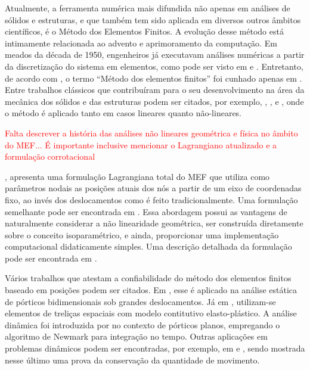 \documentclass[Tese.tex]{subfiles}
\begin{document}
Atualmente, a ferramenta numérica mais difundida não apenas em análises de sólidos e estruturas, e que também tem sido aplicada em diversos outros âmbitos científicos, é o Método dos Elementos Finitos. A evolução desse método está intimamente relacionada ao advento e aprimoramento da computação. Em meados da década de 1950, engenheiros já executavam análises numéricas a partir da discretização do sistema em elementos, como pode ser visto em  e . Entretanto, de acordo com , o termo ``Método dos elementos finitos''
foi cunhado apenas em . Entre trabalhos clássicos que contribuíram para o seu desenvolvimento na área da mecânica dos sólidos e das estruturas podem ser citados, por exemplo, , ,  e , onde o método é aplicado tanto em casos lineares quanto não-lineares.%

\textcolor{red}{Falta descrever a história das análises não lineares geométrica e física no âmbito do MEF... É importante inclusive mencionar o Lagrangiano atualizado e a formulação corrotacional}

, apresenta uma formulação Lagrangiana total do MEF que utiliza como parâmetros nodais as posições atuais dos nós a partir de um eixo de coordenadas fixo, ao invés dos deslocamentos como é feito tradicionalmente. Uma formulação semelhante pode ser encontrada em .
Essa abordagem possui as vantagens de naturalmente considerar a não linearidade geométrica, ser construída diretamente sobre o conceito isoparamétrico, e ainda, proporcionar uma implementação computacional didaticamente simples. Uma descrição detalhada da formulação pode ser encontrada em .

Vários trabalhos que atestam a confiabilidade do método dos elementos finitos baseado em posições podem ser citados. Em
, esse é aplicado na análise estática de pórticos bidimensionais sob grandes deslocamentos. Já em
, utilizam-se elementos de treliças espaciais com modelo contitutivo elasto-plástico. A análise dinâmica foi introduzida por  no contexto de pórticos planos, empregando o algoritmo de Newmark para integração no tempo. Outras aplicações em problemas dinâmicos podem ser encontradas, por exemplo, em  e , sendo mostrada nesse último uma prova da conservação da quantidade de movimento.
\end{document}
